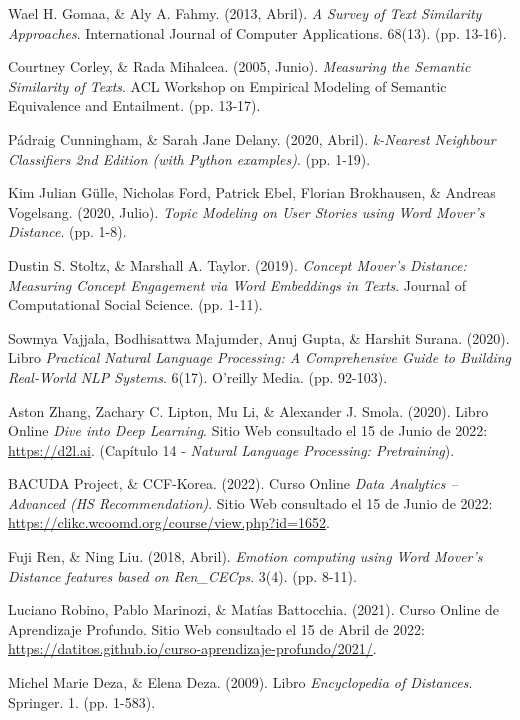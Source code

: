 \documentclass[12pt,a4paper]{article}
\begin{document}
\begin{sloppypar}
\begin{thebibliography}{9}
Wael H. Gomaa, \& Aly A. Fahmy. (2013, Abril). \textit{A Survey of Text Similarity Approaches}. International Journal of Computer Applications. 68(13). (pp. 13-16).

Courtney Corley, \& Rada Mihalcea. (2005, Junio). \textit{Measuring the Semantic Similarity of Texts}. ACL Workshop on Empirical Modeling of Semantic Equivalence and Entailment. (pp. 13-17).

Pádraig Cunningham, \& Sarah Jane Delany. (2020, Abril). \textit{k-Nearest Neighbour Classifiers 2nd Edition (with Python examples)}. (pp. 1-19).

Kim Julian Gülle, Nicholas Ford, Patrick Ebel, Florian Brokhausen, \& Andreas Vogelsang. (2020, Julio). \textit{Topic Modeling on User Stories using Word Mover’s Distance}. (pp. 1-8).

Dustin S. Stoltz, \& Marshall A. Taylor. (2019). \textit{Concept Mover’s Distance: Measuring Concept Engagement via Word Embeddings in Texts}. Journal of Computational Social Science. (pp. 1-11).

Sowmya Vajjala, Bodhisattwa Majumder, Anuj Gupta, \& Harshit Surana. (2020). Libro \textit{Practical Natural Language Processing: A Comprehensive Guide to Building Real-World NLP Systems}. 6(17). O’reilly Media. (pp. 92-103).

Aston Zhang, Zachary C. Lipton, Mu Li, \& Alexander J. Smola. (2020). Libro Online \textit{Dive into Deep Learning}. Sitio Web consultado el 15 de Junio de 2022: \url{https://d2l.ai}. (Capítulo 14 - \textit{Natural Language Processing: Pretraining}).

BACUDA Project, \& CCF-Korea. (2022). Curso Online \textit{Data Analytics – Advanced (HS Recommendation)}. Sitio Web consultado el 15 de Junio de 2022: \url{https://clikc.wcoomd.org/course/view.php?id=1652}.

Fuji Ren, \& Ning Liu. (2018, Abril). \textit{Emotion computing using Word Mover's Distance features based on Ren\_CECps}. 3(4). (pp. 8-11).

Luciano Robino, Pablo Marinozi, \& Matías Battocchia. (2021). Curso Online de Aprendizaje Profundo. Sitio Web consultado el 15 de Abril de 2022: \url{https://datitos.github.io/curso-aprendizaje-profundo/2021/}.

Michel Marie Deza, \& Elena Deza. (2009). Libro \textit{Encyclopedia of Distances}. Springer. 1. (pp. 1-583).


\end{thebibliography}
\end{sloppypar}
\end{document}
